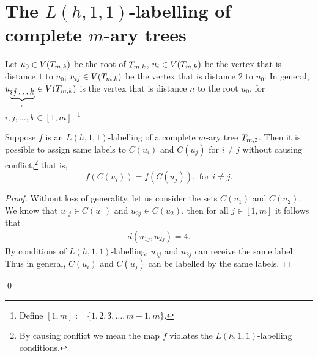 \section{The $L(h,1,1)$-labelling of complete $m$-ary trees}
Let  $u_0 \in V(T_{m,k})$ be the root of $T_{m,k}$, $u_i \in V(T_{m,k})$ be the vertex that is distance $1$ to $u_0$; $u_{ij} \in V(T_{m,k})$ be the vertex that is distance $2$ to $u_0$. In general, 
$u_{\underbrace{ij\dots k}_\text{n}} \in V(T_{m,k})$ is the vertex that is distance $n$ to the root $u_0$, for $i, j, \dots, k \in [1, m]$. \footnote{Define $[1,m]:=\{1, 2, 3, \dots, m-1, m\}$.} 


\begin{lemma}
\label{reuse}
Suppose $f$ is an $L(h,1,1)$-labelling of a complete $m$-ary tree $\tm2$. Then it is possible to assign same labels to $C(u_i)$ and $C(u_j)$ for $i \neq j$ without causing conflict,\footnote{By causing conflict we mean the map $f$ violates the $L(h,1,1)$-labelling conditions.} that is, 
\[
f(C(u_i)) = f(C(u_j)), \text{ for } i \neq j. 
\]
\end{lemma}

\begin{proof}
Without loss of generality, let us consider the sets $C(u_1)$ and $C(u_2)$. We know that $u_{1j} \in C(u_1)$ and $u_{2j} \in C(u_2)$, then for all $j \in [1,m]$ it follows that 
\begin{align}
\label{dis4}
d(u_{1j}, u_{2j}) = 4.
\end{align}
By conditions of $L(h,1,1)$-labelling, $u_{1j}$ and $u_{2j}$ can receive the same label. Thus in general, $C(u_i)$ and $C(u_j)$ can be labelled by the same labels.  
\end{proof}
\qed

